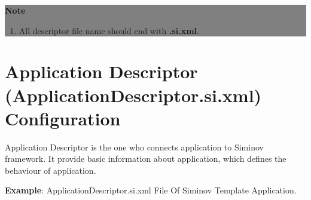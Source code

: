 \begin{center}
	\colorbox{grey}{
		\parbox[t]{.8\linewidth}{
			\fontsize{11pt}{11pt}\selectfont %
			\vspace*{0.1cm} %
		
			\hfill \textbf{Note} \\

			\hfill 	
			\begin{enumerate}
			
				\item \small All descriptor file name should end with \textbf{.si.xml}.

			\end{enumerate}

			\vspace*{0.0cm} %
		}
	}

\end{center}



\newpage
\section{Application Descriptor (ApplicationDescriptor.si.xml) Configuration} 
	Application Descriptor is the one who connects application to Siminov framework. It provide basic information about application, which defines the behaviour of application.



\newpage
\textbf{Example}: ApplicationDescriptor.si.xml File Of Siminov Template Application.


